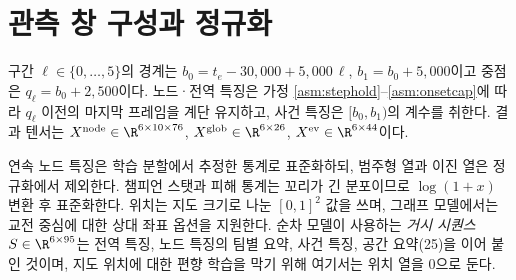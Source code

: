 
\section{관측 창 구성과 정규화}
\label{sec:feat-window}

구간 $\ell \in \{0, \dots, 5\}$의 경계는 $b_0 = t_e - 30{,}000 + 5{,}000\,\ell$, $b_1 = b_0 + 5{,}000$이고 중점은 $q_\ell = b_0 + 2{,}500$이다. 노드·전역 특징은 가정 \ref{asm:stephold}--\ref{asm:onsetcap}에 따라 $q_\ell$ 이전의 마지막 프레임을 계단 유지하고, 사건 특징은 $[b_0, b_1)$의 계수를 취한다. 결과 텐서는 $X^{\mathrm{node}} \in \R^{6\times 10\times 76}$, $X^{\mathrm{glob}} \in \R^{6\times 26}$, $X^{\mathrm{ev}} \in \R^{6\times 44}$이다.

연속 노드 특징은 학습 분할에서 추정한 통계로 표준화하되, 범주형 열과 이진 열은 정규화에서 제외한다. 챔피언 스탯과 피해 통계는 꼬리가 긴 분포이므로 $\log(1 + x)$ 변환 후 표준화한다. 위치는 지도 크기로 나눈 $[0,1]^2$ 값을 쓰며, 그래프 모델에서는 교전 중심에 대한 상대 좌표 옵션을 지원한다. 순차 모델이 사용하는 \emph{거시 시퀀스} $S \in \R^{6 \times 95}$는 전역 특징, 노드 특징의 팀별 요약, 사건 특징, 공간 요약(25)을 이어 붙인 것이며, 지도 위치에 대한 편향 학습을 막기 위해 여기서는 위치 열을 0으로 둔다.
